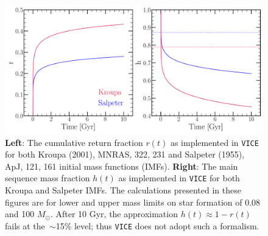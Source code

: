 \documentclass{report}
\begin{document}
\begin{figure}[!ht]
\centering 
\includegraphics[scale = 0.47]{../rh_2panel/rh2panel.pdf}
\caption{\textbf{Left}: The cumulative return fraction $r(t)$ as implemented 
in \texttt{VICE} for both Kroupa (2001), MNRAS, 322, 231 and Salpeter (1955), 
ApJ, 121, 161 initial mass functions (IMFs). \textbf{Right}: The main sequence 
mass fraction $h(t)$ as implemented in \texttt{VICE} for both Kroupa and 
Salpeter IMFs. The calculations presented in these figures are for lower and 
upper mass limits on star formation of 0.08 and 100 $M_\odot$. After 10 Gyr, 
the approximation $h(t) \approx 1 - r(t)$ fails at the~$\sim$15\% level; thus 
\texttt{VICE} does not adopt such a formalism. } 
\label{fig:rh_2panel}
\end{figure}
\end{document}
